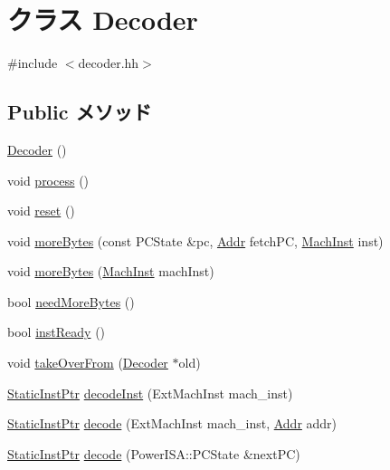\hypertarget{classPowerISA_1_1Decoder}{
\section{クラス Decoder}
\label{classPowerISA_1_1Decoder}
}


{\ttfamily \#include $<$decoder.hh$>$}\subsection*{Public メソッド}
\begin{DoxyCompactItemize}
\item 
\hyperlink{classPowerISA_1_1Decoder_aedfa2b7d97ed17b14903ed75d6214c78}{Decoder} ()
\item 
void \hyperlink{classPowerISA_1_1Decoder_a2e9c5136d19b1a95fc427e0852deab5c}{process} ()
\item 
void \hyperlink{classPowerISA_1_1Decoder_ad20897c5c8bd47f5d4005989bead0e55}{reset} ()
\item 
void \hyperlink{classPowerISA_1_1Decoder_a85a99c8dd9425508bee9a17836dbbd12}{moreBytes} (const PCState \&pc, \hyperlink{base_2types_8hh_af1bb03d6a4ee096394a6749f0a169232}{Addr} fetchPC, \hyperlink{namespacePowerISA_a301c22ea09fa33dcfe6ddf22f203699c}{MachInst} inst)
\item 
void \hyperlink{classPowerISA_1_1Decoder_ad64ff6faaad6c993e98f9c2bcbf25f0e}{moreBytes} (\hyperlink{namespacePowerISA_a301c22ea09fa33dcfe6ddf22f203699c}{MachInst} machInst)
\item 
bool \hyperlink{classPowerISA_1_1Decoder_a35631c47fc45b69ca30e6551f9f5d1d1}{needMoreBytes} ()
\item 
bool \hyperlink{classPowerISA_1_1Decoder_a9f6a0bc8946ca58d5d59a5dbc6a3181f}{instReady} ()
\item 
void \hyperlink{classPowerISA_1_1Decoder_a83393f90e7cbd98eda9721ba6022d0e0}{takeOverFrom} (\hyperlink{classPowerISA_1_1Decoder}{Decoder} $\ast$old)
\item 
\hyperlink{classRefCountingPtr}{StaticInstPtr} \hyperlink{classPowerISA_1_1Decoder_a148768e0e9062eb41f604040d0ea86e6}{decodeInst} (ExtMachInst mach\_\-inst)
\item 
\hyperlink{classRefCountingPtr}{StaticInstPtr} \hyperlink{classPowerISA_1_1Decoder_a4ed948f8d08575cc2916fe32154ea69d}{decode} (ExtMachInst mach\_\-inst, \hyperlink{base_2types_8hh_af1bb03d6a4ee096394a6749f0a169232}{Addr} addr)
\item 
\hyperlink{classRefCountingPtr}{StaticInstPtr} \hyperlink{classPowerISA_1_1Decoder_a56285ab0fc7228a06c1af831d0f3a949}{decode} (PowerISA::PCState \&nextPC)
\end{DoxyCompactItemize}
